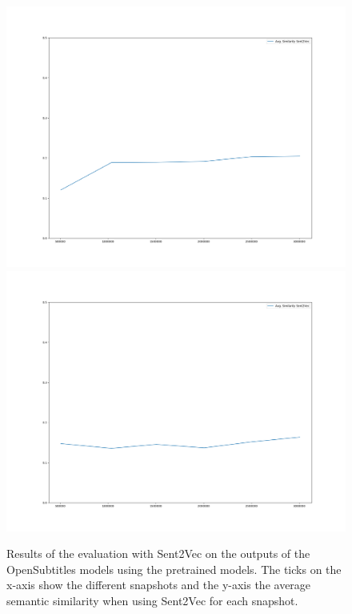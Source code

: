\begin{figure}[H]
	\includegraphics[width=\linewidth]{img/plots/opensubtitles_not_reversed/s2v_wiki_cosine_similarity.png}
	\centering
	\small
	\endminipage\hfill
	\includegraphics[width=\linewidth]{img/plots/opensubtitles_not_reversed/s2v_twitter_cosine_similarity.png}
	\centering
	\small
	\endminipage\hfill
	\caption{Results of the evaluation with Sent2Vec on the outputs of the OpenSubtitles models using the pretrained models. The ticks on the x-axis show the different snapshots and the y-axis the average semantic similarity when using Sent2Vec for each snapshot.}
	\label{results:sent2vec:opensubtitles:results}
\end{figure}

